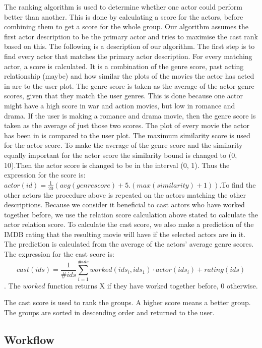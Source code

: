 The ranking algorithm is used to determine whether one actor could perform better than another. This is done by calculating a score for the actors, before combining them to get a score for the whole group. Our algorithm assumes the first actor description to be the primary actor and tries to maximise the cast rank based on this. The following is a description of our algorithm. The first step is to find every actor that matches the primary actor description. For every matching actor, a score is calculated. It is a combination of the genre score, past acting relationship (maybe) and how similar the plots of the movies the actor has acted in are to the user plot. The genre score is taken as the average of the actor genre scores, given that they match the user genres. This is done because one actor might have a high score in war and action movies, but low in romance and drama. If the user is making a romance and drama movie, then the genre score is taken as the average of just those two scores. The plot of every movie the actor has been in is compared to the user plot. The maximum similarity score is used for the actor score. To make the average of the genre score and the similarity equally important for the actor score the similarity bound is changed to (0, 10).Then the actor score is changed to be in the interval (0, 1). Thus the expression for the score is: $actor(id)=\frac{1}{20}(avg(genrescore)+5.(max(similarity)+1))$.To find the other actors the procedure above is repeated on the actors matching the other descriptions. Because we consider it beneficial to cast actors who have worked together before, we use the relation score calculation above stated to calculate the actor relation score. To calculate the cast score, we also make a prediction of the IMDB rating that the resulting movie will have if the selected actors are in it. The prediction is calculated from the average of the actors’ average genre scores. The expression for the cast score is: $$cast(ids)=\frac{1}{\#ids}\sum_{i=1}^{\#ids}worked(ids_i, ids_1)\cdot actor(ids_i) + rating(ids)$$. The $worked$ function returns X if they have worked together before, 0 otherwise. 

The cast score is used to rank the groups. A higher score means a better group. The groups are sorted in descending order and returned to the user.



\subsection{Workflow}

